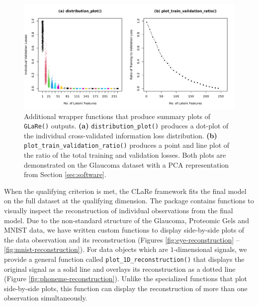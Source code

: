 \begin{figure}
    \centering
    \includegraphics[width=1\linewidth]{figures/additional-plots-01.pdf}
    \caption{Additional wrapper functions that produce summary plots of \texttt{GLaRe()} outputs. \textbf{(a)} \texttt{distribution\_plot()} produces a dot-plot of the individual cross-validated information loss distribution. \textbf{(b)} \texttt{plot\_train\_validation\_ratio()} produces a point and line plot of the ratio of the total training and validation losses.
    Both plots are demonstrated on the Glaucoma dataset with a PCA representation from Section \ref{sec:software}.}
    \label{fig:additional-plots-01}
\end{figure}

When the qualifying criterion is met, the CLaRe framework fits the final model on the full dataset at the qualifying dimension.
The  package contains functions to visually inspect the reconstruction of individual observations from the final model.
Due to the non-standard structure of the Glaucoma, Proteomic Gels and MNIST data, we have written custom functions to display side-by-side plots of the data observation and its reconstruction (Figures \ref{fig:eye-reconstruction} -- \ref{fig:mnist-reconstruction}).
For data objects which are $1$-dimensional signals, we provide a general function called \texttt{plot\_1D\_reconstruction()} that displays the original signal as a solid line and overlays its reconstruction as a dotted line (Figure \ref{fig:phoneme-reconstruction}).
Unlike the specialized functions that plot side-by-side plots, this function can display the reconstruction of more than one observation simultaneously.

